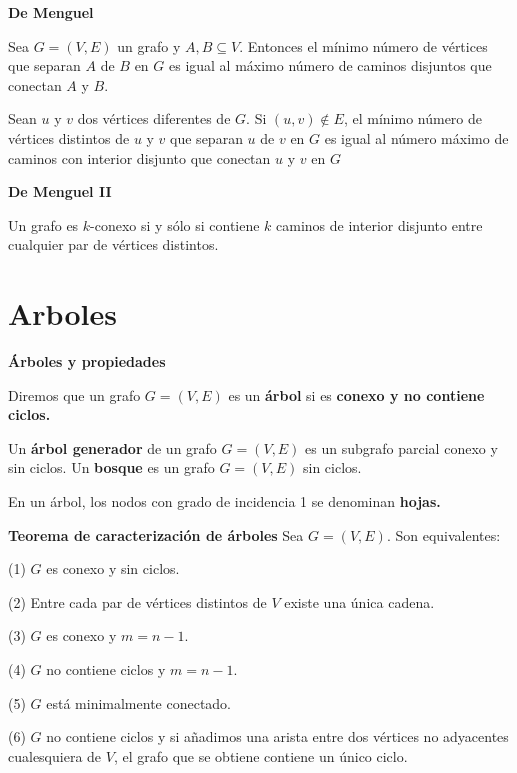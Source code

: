 \documentclass[openany]{book}
\begin{document}
\begin{theorem}
  { \color{turquoise} \textbf{De Menguel}}


  Sea $G=(V, E)$ un grafo y $A, B \subseteq V$. Entonces el mínimo número de vértices que separan $A$ de $B$ en $G$ es igual al máximo número de caminos disjuntos que conectan $A$ y $B$.

\end{theorem}

\begin{proposition}
  Sean $u$ y $v$ dos vértices diferentes de $G .$ Si $(u, v) \notin E$, el mínimo número de vértices distintos de $u$ y $v$ que separan $u$ de $v$ en $G$ es igual al número máximo de caminos con interior disjunto que conectan $u$ y $v$ en $G$
\end{proposition}

\begin{theorem}
  { \color{turquoise} \textbf{De Menguel II}}


  Un grafo es $k$-conexo si y sólo si contiene $k$ caminos de interior disjunto entre cualquier par de vértices distintos.

\end{theorem}


\chapter{Arboles}

\begin{definition}
  { \color{turquoise} \textbf{Árboles y propiedades}}

  Diremos que un grafo $G=(V, E)$ es un \textbf{árbol} si es \textbf{conexo y no contiene ciclos.}

Un \textbf{árbol generador} de un grafo $G=(V, E)$ es un subgrafo parcial conexo y sin ciclos. Un \textbf{bosque} es un grafo $G=(V, E)$ sin ciclos.

En un árbol, los nodos con grado de incidencia 1 se denominan \textbf{hojas.}
\end{definition}

\begin{theorem}
  { \color{turquoise} \textbf{Teorema de caracterización de árboles}}
  Sea $G=(V, E)$. Son equivalentes:

  (1) $G$ es conexo y sin ciclos.

  (2) Entre cada par de vértices distintos de $V$ existe una única cadena.

  (3) $G$ es conexo y $m=n-1$.

  (4) $G$ no contiene ciclos y $m=n-1$.

  (5) $G$ está minimalmente conectado.

  (6) $G$ no contiene ciclos y si añadimos una arista entre dos vértices no adyacentes cualesquiera de $V$, el grafo que se obtiene contiene un único ciclo.
\end{theorem}
\end{document}
